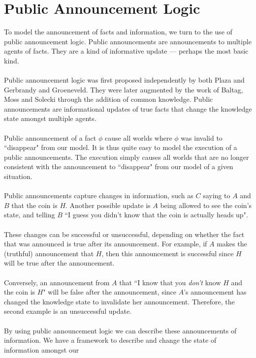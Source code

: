 \documentclass[12pt, a4paper, twoside]{article}
\begin{document}
\section{Public Announcement Logic}\label{pal}
To model the announcement of facts and information, we turn to the use of public
announcement logic.
Public announcements are announcements to multiple agents of facts.
They are a kind of informative update --- perhaps the most basic kind.\\
\\
Public announcement logic was first proposed independently by both Plaza and
Gerbrandy and Groeneveld. \citep{plaza2007public,gelbrandy1997reasoning}
They were later augmented by the work of Baltag, Moss and Solecki through the
addition of common knowledge. \citep{baltag1998lpa}
Public announcements are informational updates of true facts that change the
knowledge state amongst multiple agents.\\
\\
Public announcement of a fact $\phi$ cause all worlds where $\phi$ was
invalid to ``disappear" from our model.
It is thus quite easy to model the execution of a public announcements.
The execution simply causes all worlds that are no longer consistent with the
announcement to ``disappear" from our model of a given situation.\\
\\
Public announcements capture changes in information, such as $C$ saying to
$A$ and $B$ that the coin is $H$.
Another possible update is $A$ being allowed to see the coin's state, and
telling $B$ ``I guess you didn't know that the coin is actually heads up".\\
\\
These changes can be successful or unsuccessful, depending on whether the fact
that was announced is true after its announcement.
For example, if $A$ makes the (truthful) announcement that $H$, then this
announcement is successful since $H$ will be true after the announcement.\\
\\
Conversely, an announcement from $A$ that ``I know that you {\em don't} know $H$
and the coin is $H$" will be false after the announcement, since $A$'s
announcement has changed the knowledge state to invalidate her
announcement.
Therefore, the second example is an unsuccessful update.\\
\\
By using public announcement logic we can describe these announcements of
information.
We have a framework to describe and change the state of information amongst our
\end{document}
